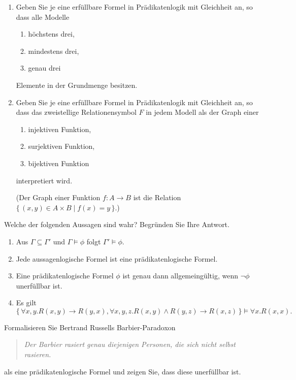 \documentclass[german]{latteachCD}[2017/03/28]
\begin{document}
\begin{exercise}
  \begin{enumerate}
  \item Geben Sie je eine erfüllbare Formel in Prädikatenlogik mit Gleichheit
    an, so dass alle Modelle
    \begin{enumerate}
    \item höchstens drei,
    \item mindestens drei,
    \item genau drei
    \end{enumerate}
    Elemente in der Grundmenge besitzen.
  \item Geben Sie je eine erfüllbare Formel in Prädikatenlogik mit Gleichheit
    an, so dass das zweistellige Relationensymbol $F$ in jedem Modell als der
    Graph einer
    \begin{enumerate}
    \item injektiven Funktion,
    \item surjektiven Funktion,
    \item bijektiven Funktion
    \end{enumerate}
    interpretiert wird.

    (Der Graph einer Funktion $f \colon A \to B$ ist die Relation $\{\,(x,y) \in
    A \times B \mid f(x) = y\,\}$.)
  \end{enumerate}
\end{exercise}

\begin{exercise}
  Welche der folgenden Aussagen sind wahr?  Begründen Sie Ihre Antwort.
  \begin{enumerate}
  \item Aus $\Gamma \subseteq \Gamma'$ und $\Gamma \models \phi$ folgt $\Gamma'
    \models \phi$.
  \item Jede aussagenlogische Formel ist eine prädikatenlogische Formel.
  \item Eine prädikatenlogische Formel $\phi$ ist genau dann allgemeingültig,
    wenn $\lnot \phi$ unerfüllbar ist.
  \item Es gilt
    \begin{equation*}
      \{\,\forall x, y. R(x,y) \to R(y,x), \forall x, y, z. R(x,y) \land R(y,z)
      \to R(x,z)\,\} \models \forall x. R(x,x).
    \end{equation*}
  \end{enumerate}
\end{exercise}

\begin{exercise}
  Formalisieren Sie Bertrand Russells Barbier-Paradoxon
  \begin{quote}
    \emph{Der Barbier rasiert genau diejenigen Personen, die sich nicht selbst rasieren.}
  \end{quote}
  als eine prädikatenlogische Formel und zeigen Sie, dass diese unerfüllbar ist.
\end{exercise}
\end{document}
